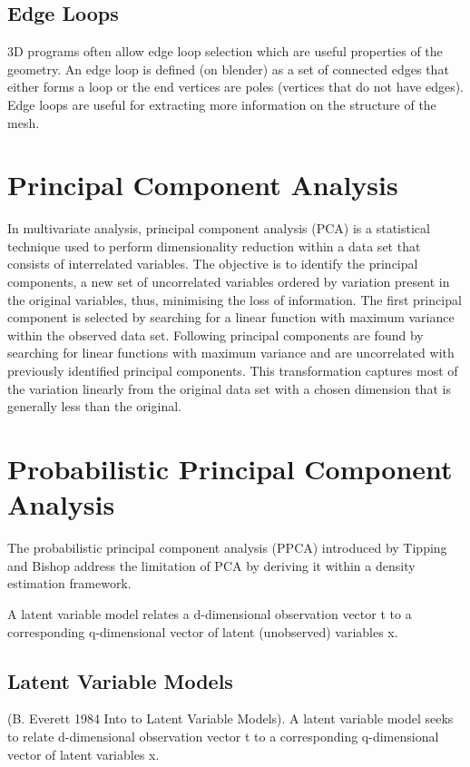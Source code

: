 \documentclass[ %
                    author={Dillon Keith Diep},
                supervisor={Dr. Carl Henrik Ek},
                    degree={MEng},
                     title={Assisted Content Generation for 3D Hair Geometry},
                  subtitle={[INCOMPLETE DRAFT, CONTAINS NOTES FROM RESEARCH]},
                      type={Research},
                      year={2014} ]{dissertation}
\begin{document}
\subsection{Edge Loops}
3D programs often allow edge loop selection which are useful properties of the geometry. An edge loop is defined (on blender) as a set of connected edges that either forms a loop or the end vertices are poles (vertices that do not have edges). Edge loops are useful for extracting more information on the structure of the mesh.
\cite{edgeloops}

\section{Principal Component Analysis}
In multivariate analysis, principal component analysis (PCA) is a statistical technique used to perform dimensionality reduction within a data set that consists of interrelated variables.
The objective is to identify the principal components, a new set of uncorrelated variables ordered by variation present in the original variables, thus, minimising the loss of information.\cite{pca2002}
The first principal component is selected by searching for a linear function with maximum variance within the observed data set.
Following principal components are found by searching for linear functions with maximum variance and are uncorrelated with previously identified principal components.
This transformation captures most of the variation linearly from the original data set with a chosen dimension that is generally less than the original.

\section{Probabilistic Principal Component Analysis}
The probabilistic principal component analysis (PPCA) introduced by Tipping and Bishop address the limitation of PCA by deriving it within a density estimation framework.\cite{ppca}

A latent variable model relates a d-dimensional observation vector t to a corresponding q-dimensional vector of latent (unobserved) variables x.

\subsection{Latent Variable Models}
(B. Everett 1984 Into to Latent Variable Models).	
A latent variable model seeks to relate d-dimensional observation vector t to a corresponding q-dimensional vector of latent variables x.
\end{document}
